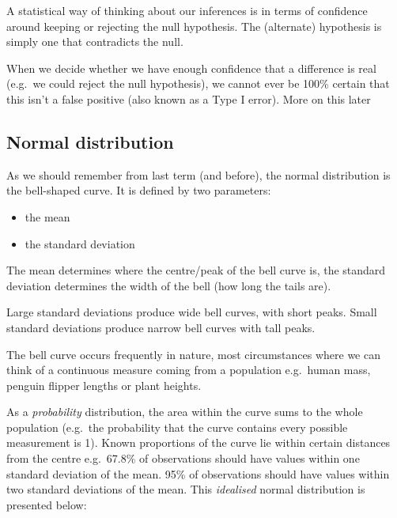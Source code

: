 \documentclass[
]{book}
\makeatletter
\newenvironment{kframe}{%
\medskip{}
\setlength{\fboxsep}{.8em}
 \def\at@end@of@kframe{}%
 \ifinner\ifhmode%
  \def\at@end@of@kframe{\end{minipage}}%
  \begin{minipage}{\columnwidth}%
 \fi\fi%
 \def\FrameCommand##1{\hskip\@totalleftmargin \hskip-\fboxsep
 \colorbox{shadecolor}{##1}\hskip-\fboxsep
     \hskip-\linewidth \hskip-\@totalleftmargin \hskip\columnwidth}%
 \MakeFramed {\advance\hsize-\width
   \@totalleftmargin\z@ \linewidth\hsize
   \@setminipage}}%
 {\par\unskip\endMakeFramed%
 \at@end@of@kframe}
\newenvironment{block}[1]
  {
  \begin{itemize}
  \renewcommand{\labelitemi}{
    \raisebox{-.7\height}[0pt][0pt]{
      {\setkeys{Gin}{width=3em,keepaspectratio}\texttt{[image: images/\#1]}}
    }
  }
  \setlength{\fboxsep}{1em}
  \begin{kframe}
  \item
  }
  {
  \end{kframe}
  \end{itemize}
  }
\newenvironment{rmdnote}
  {\begin{block}{note}}
  {\end{block}}
\makeatother
\begin{document}
\begin{rmdnote}
A statistical way of thinking about our inferences is in terms of
confidence around keeping or rejecting the null hypothesis. The
(alternate) hypothesis is simply one that contradicts the null.

When we decide whether we have enough confidence that a difference is
real (e.g.~we could reject the null hypothesis), we cannot ever be 100\%
certain that this isn't a false positive (also known as a Type I error).
More on this later
\end{rmdnote}

\hypertarget{normal-distribution}{%
\subsection{Normal distribution}\label{normal-distribution}}

As we should remember from last term (and before), the normal distribution is the bell-shaped curve. It is defined by two parameters:

\begin{itemize}
\item
  the mean
\item
  the standard deviation
\end{itemize}

The mean determines where the centre/peak of the bell curve is, the standard deviation determines the width of the bell (how long the tails are).

Large standard deviations produce wide bell curves, with short peaks. Small standard deviations produce narrow bell curves with tall peaks.

The bell curve occurs frequently in nature, most circumstances where we can think of a continuous measure coming from a population e.g.~human mass, penguin flipper lengths or plant heights.

As a \emph{probability} distribution, the area within the curve sums to the whole population (e.g.~the probability that the curve contains every possible measurement is 1). Known proportions of the curve lie within certain distances from the centre e.g.~67.8\% of observations should have values within one standard deviation of the mean. 95\% of observations should have values within two standard deviations of the mean. This \emph{idealised} normal distribution is presented below:
\end{document}
